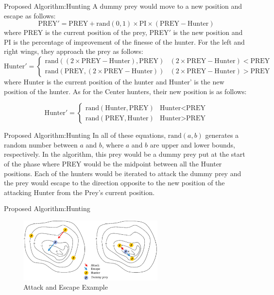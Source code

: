 \documentclass{beamer}
\begin{document}
\begin{frame}{Proposed Algorithm:Hunting}
A dummy prey would move to a new position and escape as follows:
$$\text{PREY}' = \text{PREY} + \text{rand}(0,1) \times \text{PI} \times (\text{PREY} - \text{Hunter})$$
where PREY is the current position of the prey, PREY$'$ is the new position and PI is the percentage of improvement of the finesse of the hunter.
For the left and right wings, they approach the prey as follows:
\small
\[ \text{Hunter}' =  \begin{cases} 
      \text{rand}((2 \times \text{PREY} - \text{Hunter}), \text{PREY}) & (2 \times \text{PREY} - \text{Hunter}) < \text{PREY} \\
      \text{rand}(\text{PREY}, (2 \times \text{PREY} - \text{Hunter})) & (2 \times \text{PREY} - \text{Hunter}) > \text{PREY}
   \end{cases}
\]
\normalsize
where Hunter is the current position of the hunter and Hunter' is the new position of the hunter.
As for the Center hunters, their new position is as follows:

\[ \text{Hunter}' =  \begin{cases} 
      \text{rand}(\text{Hunter}, \text{PREY}) & \text{Hunter} < \text{PREY} \\
      \text{rand}(\text{PREY}, \text{Hunter}) & \text{Hunter} > \text{PREY}
   \end{cases}
\]
\end{frame}
\begin{frame}{Proposed Algorithm:Hunting}
In all of these equations, $\text{rand}(a,b)$ generates a random number between $a$ and $b$, where $a$ and $b$ are upper and lower bounds, respectively.
In the algorithm, this prey would be a dummy prey put at the start of the phase where PREY would be the midpoint between all the Hunter positions. Each of the hunters would be iterated to attack the dummy prey and the prey would escape to the direction opposite to the new position of the attacking Hunter from the Prey's current position.
\end{frame}
\begin{frame}{Proposed Algorithm:Hunting}
\begin{figure}[h]
\begin{center}
\includegraphics[width=0.65\textwidth]{img/pa/hunting_attack}
\caption{Attack and Escape Example}
\end{center}
\end{figure}
\end{frame}
\end{document}
